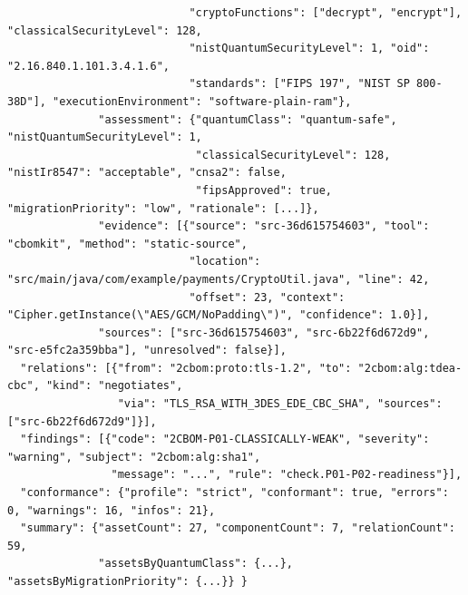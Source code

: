 \documentclass[11pt,a4paper]{article}
\theoremstyle{definition}
\theoremstyle{plain}
\begin{document}
\begin{lstlisting}
                            "cryptoFunctions": ["decrypt", "encrypt"], "classicalSecurityLevel": 128,
                            "nistQuantumSecurityLevel": 1, "oid": "2.16.840.1.101.3.4.1.6",
                            "standards": ["FIPS 197", "NIST SP 800-38D"], "executionEnvironment": "software-plain-ram"},
              "assessment": {"quantumClass": "quantum-safe", "nistQuantumSecurityLevel": 1,
                             "classicalSecurityLevel": 128, "nistIr8547": "acceptable", "cnsa2": false,
                             "fipsApproved": true, "migrationPriority": "low", "rationale": [...]},
              "evidence": [{"source": "src-36d615754603", "tool": "cbomkit", "method": "static-source",
                            "location": "src/main/java/com/example/payments/CryptoUtil.java", "line": 42,
                            "offset": 23, "context": "Cipher.getInstance(\"AES/GCM/NoPadding\")", "confidence": 1.0}],
              "sources": ["src-36d615754603", "src-6b22f6d672d9", "src-e5fc2a359bba"], "unresolved": false}],
  "relations": [{"from": "2cbom:proto:tls-1.2", "to": "2cbom:alg:tdea-cbc", "kind": "negotiates",
                 "via": "TLS_RSA_WITH_3DES_EDE_CBC_SHA", "sources": ["src-6b22f6d672d9"]}],
  "findings": [{"code": "2CBOM-P01-CLASSICALLY-WEAK", "severity": "warning", "subject": "2cbom:alg:sha1",
                "message": "...", "rule": "check.P01-P02-readiness"}],
  "conformance": {"profile": "strict", "conformant": true, "errors": 0, "warnings": 16, "infos": 21},
  "summary": {"assetCount": 27, "componentCount": 7, "relationCount": 59,
              "assetsByQuantumClass": {...}, "assetsByMigrationPriority": {...}} }
\end{lstlisting}
\end{document}
